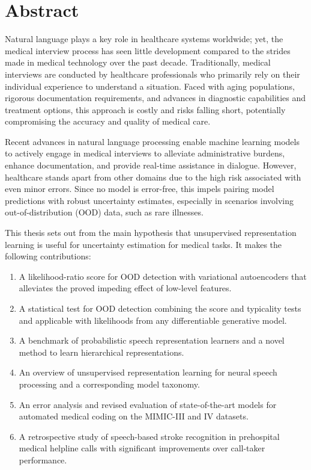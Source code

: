 
\chapter[abstract]{Abstract}

Natural language plays a key role in healthcare systems worldwide; yet, the medical interview process has seen little development compared to the strides made in medical technology over the past decade. 
Traditionally, medical interviews are conducted by healthcare professionals who primarily rely on their individual experience to understand a situation. 
Faced with aging populations, rigorous documentation requirements, and advances in diagnostic capabilities and treatment options, this approach is costly and risks falling short, potentially compromising the accuracy and quality of medical care.

Recent advances in natural language processing enable machine learning models to actively engage in medical interviews to alleviate administrative burdens, enhance documentation, and provide real-time assistance in dialogue. 
However, healthcare stands apart from other domains due to the high risk associated with even minor errors. Since no model is error-free, this impels pairing model predictions with robust uncertainty estimates, especially in scenarios involving out-of-distribution (OOD) data, such as rare illnesses. 

This thesis sets out from the main hypothesis that unsupervised representation learning is useful for uncertainty estimation for medical tasks. 
It makes the following contributions:
%
\begin{enumerate}[topsep=3pt, partopsep=0pt, itemsep=3pt, parsep=0pt, leftmargin=2em, label=(\alph*)] %
    \item A likelihood-ratio score for OOD detection with variational autoencoders that alleviates the proved impeding effect of low-level features.
    \item A statistical test for OOD detection combining the score and typicality tests and applicable with likelihoods from any differentiable generative model.
    \item A benchmark of probabilistic speech representation learners and a novel method to learn hierarchical representations.
    \item An overview of unsupervised representation learning for neural speech processing and a corresponding model taxonomy.
    \item An error analysis and revised evaluation of state-of-the-art models for automated medical coding on the MIMIC-III and IV datasets. 
    \item A retrospective study of speech-based stroke recognition in prehospital medical helpline calls with significant improvements over call-taker performance.
\end{enumerate}
%

